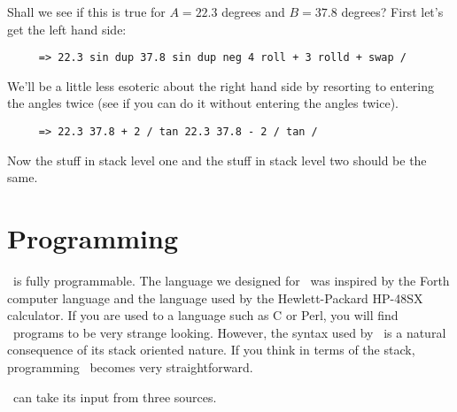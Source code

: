 \documentclass{report}
\begin{document}
Shall we see if this is true for $A = 22.3$ degrees and $B = 37.8$ degrees? First let's get the
left hand side:

\begin{verbatim}
     => 22.3 sin dup 37.8 sin dup neg 4 roll + 3 rolld + swap /
\end{verbatim}

We'll be a little less esoteric about the right hand side by resorting to entering the angles
twice (see if you can do it without entering the angles twice).

\begin{verbatim}
     => 22.3 37.8 + 2 / tan 22.3 37.8 - 2 / tan /
\end{verbatim}

Now the stuff in stack level one and the stuff in stack level two should be the same.

\chapter{Programming}

\CLAC\ is fully programmable. The language we designed for \CLAC\ was inspired by the Forth
computer language and the language used by the Hewlett-Packard HP-48SX calculator. If you are
used to a language such as C or Perl, you will find \CLAC\ programs to be very strange looking.
However, the syntax used by \CLAC\ is a natural consequence of its stack oriented nature. If you
think in terms of the stack, programming \CLAC\ becomes very straightforward.

\CLAC\ can take its input from three sources.
\end{document}
